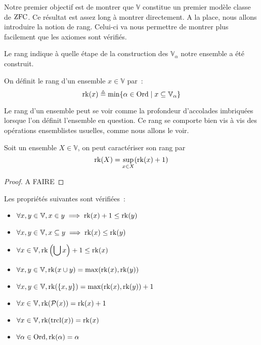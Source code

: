 Notre premier objectif est de montrer que $\mathbb V$ constitue un premier
modèle classe de $\operatorname{ZFC}$. Ce résultat est assez long à montrer directement. A la
place, nous allons introduire la notion de rang. Celui-ci va nous permettre de
montrer plus facilement que les axiomes sont vérifiés.

Le rang indique à quelle étape de la construction des $\mathbb V_\alpha$ notre
ensemble a été construit.

\begin{definition}[Rang]
  On définit le rang d'un ensemble $x\in\mathbb V$ par~:
  \[\operatorname{rk}(x) \triangleq \min \{\alpha \in \operatorname{Ord}\mid x\subseteq \mathbb V_\alpha\}\]
\end{definition}

Le rang d'un ensemble peut se voir comme la profondeur d'accolades imbriquées
lorsque l'on définit l'ensemble en question. Ce rang se comporte bien vis à vis
des opérations ensemblistes usuelles, comme nous allons le voir.

\begin{proposition}\label{prop.cara.rk}
  Soit un ensemble $X\in\mathbb V$, on peut caractériser son rang par
  \[\operatorname{rk}(X) = \sup_{x \in X} (\operatorname{rk}(x) + 1)\]
\end{proposition}

\begin{proof}
  A FAIRE
\end{proof}

\begin{property}
  Les propriétés suivantes sont vérifiées~:
  \begin{itemize}
  \item $\forall x,y\in\mathbb V, x\in y \implies \operatorname{rk}(x) + 1 \leq \operatorname{rk}(y)$
  \item $\forall x,y\in\mathbb V, x\subseteq y \implies \operatorname{rk}(x) \leq \operatorname{rk}(y)$
  \item $\displaystyle \forall x\in\mathbb V,
    \operatorname{rk}\left(\bigcup x\right) + 1 \leq \operatorname{rk}(x)$
  \item $\forall x,y\in\mathbb V, \operatorname{rk}(x\cup y) = \max(\operatorname{rk}(x),\operatorname{rk}(y))$
  \item $\forall x,y\in\mathbb V, \operatorname{rk}(\{x,y\}) = \max(\operatorname{rk}(x),\operatorname{rk}(y)) + 1$
  \item $\forall x\in\mathbb V, \operatorname{rk}(\mathcal{P}(x)) = \operatorname{rk}(x) + 1$
  \item $\forall x\in\mathbb V, \operatorname{rk}(\operatorname{trcl}(x)) = \operatorname{rk}(x)$
  \item $\displaystyle \forall \alpha \in \operatorname{Ord}, \operatorname{rk}(\alpha) = \alpha$
  \end{itemize}
\end{property}

